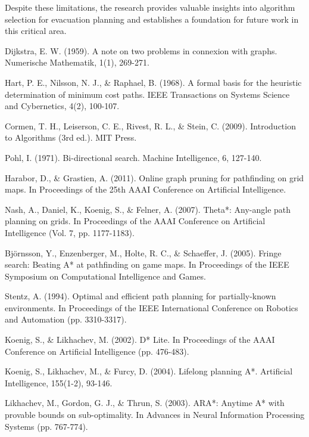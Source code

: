 \documentclass[11pt,a4paper]{report}
\begin{document}
Despite these limitations, the research provides valuable insights into algorithm selection for evacuation planning and establishes a foundation for future work in this critical area.

\begin{thebibliography}{99}
 Dijkstra, E. W. (1959). A note on two problems in connexion with graphs. Numerische Mathematik, 1(1), 269-271.

 Hart, P. E., Nilsson, N. J., \& Raphael, B. (1968). A formal basis for the heuristic determination of minimum cost paths. IEEE Transactions on Systems Science and Cybernetics, 4(2), 100-107.

 Cormen, T. H., Leiserson, C. E., Rivest, R. L., \& Stein, C. (2009). Introduction to Algorithms (3rd ed.). MIT Press.

 Pohl, I. (1971). Bi-directional search. Machine Intelligence, 6, 127-140.

 Harabor, D., \& Grastien, A. (2011). Online graph pruning for pathfinding on grid maps. In Proceedings of the 25th AAAI Conference on Artificial Intelligence.

 Nash, A., Daniel, K., Koenig, S., \& Felner, A. (2007). Theta*: Any-angle path planning on grids. In Proceedings of the AAAI Conference on Artificial Intelligence (Vol. 7, pp. 1177-1183).

 Björnsson, Y., Enzenberger, M., Holte, R. C., \& Schaeffer, J. (2005). Fringe search: Beating A* at pathfinding on game maps. In Proceedings of the IEEE Symposium on Computational Intelligence and Games.

 Stentz, A. (1994). Optimal and efficient path planning for partially-known environments. In Proceedings of the IEEE International Conference on Robotics and Automation (pp. 3310-3317).

 Koenig, S., \& Likhachev, M. (2002). D* Lite. In Proceedings of the AAAI Conference on Artificial Intelligence (pp. 476-483).

 Koenig, S., Likhachev, M., \& Furcy, D. (2004). Lifelong planning A*. Artificial Intelligence, 155(1-2), 93-146.

 Likhachev, M., Gordon, G. J., \& Thrun, S. (2003). ARA*: Anytime A* with provable bounds on sub-optimality. In Advances in Neural Information Processing Systems (pp. 767-774).


\end{thebibliography}
\end{document}
